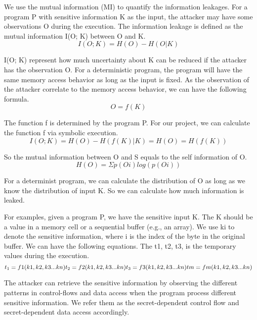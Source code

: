 We use the mutual information (MI) to quantify the information leakages. 
For a program P with sensitive information K as the input, the attacker may have some observations O during the execution. 
The information leakage is defined as the mutual information I(O; K) between O and K.
\begin{equation}
I(O; K) = H(O) - H(O|K)
\end{equation}

I(O; K) represent how much uncertainty about K can be reduced if the attacker has the observation O.
For a deterministic program, the program will have the same memory access behavior as long as the input is fixed. 
As the observation of the attacker correlate to the memory access behavior, 
we can have the following formula.
\begin{equation}
O = f(K)
\end{equation}

The function f is determined by the program P. For our project, we can calculate the function f via symbolic execution.
\begin{equation}
I(O; K) = H(O) - H(f(K)|K) = H(O) = H(f(K))
\end{equation}

So the mutual information between O and S equals to the self information of O. 
\begin{equation}
H(O) = Σp(Oi)log(p(Oi))
\end{equation}

For a determinist program, we can calculate the distribution of O as long as we know the distribution of input K. So we can calculate how much information is leaked.

For examples, given a program P, we have the sensitive input K. The K should be a value in a memory cell or a sequential buffer (e.g., an array). We use ki to denote the sensitive information, where i is the index of the byte in the original buffer.  We can have the following equations. The t1, t2, t3, is the temporary values during the execution.
\begin{equation}
t_1 = f1(k1, k2, k3 ... kn)\\
t_2 = f2(k1, k2, k3 ... kn)\\
t_3 = f3(k1, k2, k3 ... kn)\\
tm = fm(k1, k2, k3 ... kn)
\end{equation}

The attacker can retrieve the sensitive information by observing the different patterns in control-flows and data access when the program process different sensitive information. We refer them as the secret-dependent control flow and secret-dependent data access accordingly.

